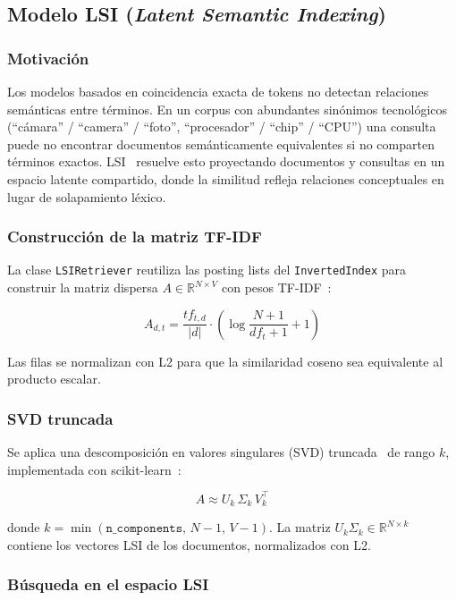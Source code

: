 \documentclass{llncs}
\begin{document}
\subsection{Modelo LSI (\textit{Latent Semantic Indexing})}
\label{sec:lsi}

\subsubsection{Motivación}

Los modelos basados en coincidencia exacta de tokens no detectan relaciones
semánticas entre términos. En un corpus con abundantes sinónimos tecnológicos
(``cámara'' / ``camera'' / ``foto'', ``procesador'' / ``chip'' / ``CPU'')
una consulta puede no encontrar documentos semánticamente equivalentes
si no comparten términos exactos. LSI~\cite{deerwester1990,manning2008}
resuelve esto proyectando documentos y consultas en un espacio latente
compartido, donde la similitud refleja relaciones conceptuales en lugar
de solapamiento léxico.

\subsubsection{Construcción de la matriz TF-IDF}

La clase \texttt{LSIRetriever} reutiliza las posting lists del
\texttt{InvertedIndex} para construir la matriz
dispersa $A \in \mathbb{R}^{N \times V}$ con pesos TF-IDF~\cite{manning2008}:

\[
  A_{d,t} = \frac{tf_{t,d}}{|d|} \cdot
    \left(\log\frac{N+1}{df_t+1} + 1\right)
\]

Las filas se normalizan con L2 para que la similaridad coseno sea equivalente
al producto escalar.

\subsubsection{SVD truncada}

Se aplica una descomposición en valores singulares (SVD) truncada~\cite{deerwester1990} de rango $k$, implementada con scikit-learn~\cite{pedregosa2011}:

\[
  A \approx U_k \,\Sigma_k\, V_k^\top
\]

donde $k = \min(\texttt{n\_components},\, N-1,\, V-1)$.  La matriz
$U_k \Sigma_k \in \mathbb{R}^{N \times k}$ contiene los vectores LSI de
los documentos, normalizados con L2.

\subsubsection{Búsqueda en el espacio LSI}
\end{document}
